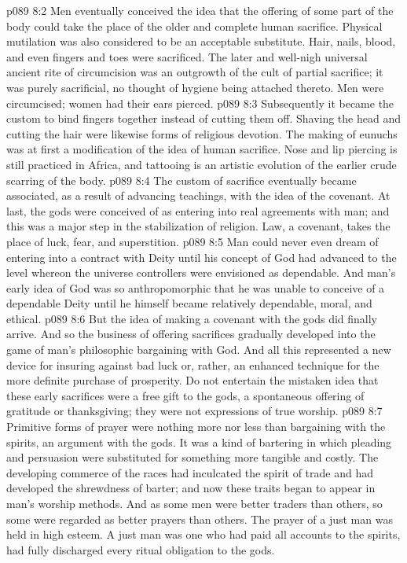\vs p089 8:2 Men eventually conceived the idea that the offering of some part of the body could take the place of the older and complete human sacrifice. Physical mutilation was also considered to be an acceptable substitute. Hair, nails, blood, and even fingers and toes were sacrificed. The later and well\hyp{}nigh universal ancient rite of circumcision was an outgrowth of the cult of partial sacrifice; it was purely sacrificial, no thought of hygiene being attached thereto. Men were circumcised; women had their ears pierced.
\vs p089 8:3 Subsequently it became the custom to bind fingers together instead of cutting them off. Shaving the head and cutting the hair were likewise forms of religious devotion. The making of eunuchs was at first a modification of the idea of human sacrifice. Nose and lip piercing is still practiced in Africa, and tattooing is an artistic evolution of the earlier crude scarring of the body.
\pc \vs p089 8:4 The custom of sacrifice eventually became associated, as a result of advancing teachings, with the idea of the covenant. At last, the gods were conceived of as entering into real agreements with man; and this was a major step in the stabilization of religion. Law, a covenant, takes the place of luck, fear, and superstition.
\vs p089 8:5 Man could never even dream of entering into a contract with Deity until his concept of God had advanced to the level whereon the universe controllers were envisioned as dependable. And man’s early idea of God was so anthropomorphic that he was unable to conceive of a dependable Deity until he himself became relatively dependable, moral, and ethical.
\vs p089 8:6 But the idea of making a covenant with the gods did finally arrive.  And so the business of offering sacrifices gradually developed into the game of man’s philosophic bargaining with God. And all this represented a new device for insuring against bad luck or, rather, an enhanced technique for the more definite purchase of prosperity. Do not entertain the mistaken idea that these early sacrifices were a free gift to the gods, a spontaneous offering of gratitude or thanksgiving; they were not expressions of true worship.
\pc \vs p089 8:7 Primitive forms of prayer were nothing more nor less than bargaining with the spirits, an argument with the gods. It was a kind of bartering in which pleading and persuasion were substituted for something more tangible and costly. The developing commerce of the races had inculcated the spirit of trade and had developed the shrewdness of barter; and now these traits began to appear in man’s worship methods. And as some men were better traders than others, so some were regarded as better prayers than others. The prayer of a just man was held in high esteem. A just man was one who had paid all accounts to the spirits, had fully discharged every ritual obligation to the gods.
